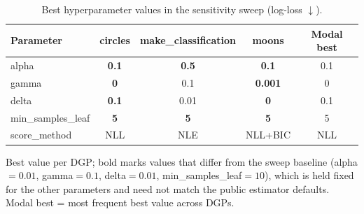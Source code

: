\begin{table}[htbp]
\centering
\caption{Best hyperparameter values in the sensitivity sweep (log-loss $\downarrow$).}
\label{tab:param-sensitivity-clas}
\begin{tabular}{lcccc}
\toprule
Parameter & circles & make\_classification & moons & Modal best \\
\midrule
alpha & \textbf{0.1} & \textbf{0.5} & \textbf{0.1} & 0.1 \\
gamma & \textbf{0} & 0.1 & \textbf{0.001} & 0 \\
delta & \textbf{0.1} & 0.01 & \textbf{0} & 0.1 \\
min\_samples\_leaf & \textbf{5} & \textbf{5} & \textbf{5} & 5 \\
\midrule
score\_method & NLL & NLE & NLL+BIC & NLL \\
\bottomrule
\end{tabular}
\par\smallskip\footnotesize{Best value per DGP; bold marks values that differ from the sweep baseline (alpha$=0.01$, gamma$=0.1$, delta$=0.01$, min\_samples\_leaf$=10$), which is held fixed for the other parameters and need not match the public estimator defaults. Modal best = most frequent best value across DGPs.}
\end{table}
